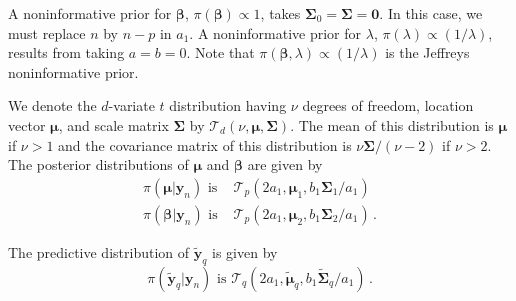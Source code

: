 \documentclass[11pt, oneside]{article}   	%
\begin{document}
A noninformative prior for $\mathbf{\beta}$, $\pi(\mathbf{\beta}) \propto 1$, takes $\mathbf{\Sigma}_0 = \mathbf{\Sigma} = \mathbf{0}$.  In this case, we must replace $n$ by $n-p$ in $a_1$.  A noninformative prior for $\lambda$, $\pi(\lambda) \propto (1/\lambda)$, results from taking $a = b = 0$.  Note that $\pi(\mathbf{\beta}, \lambda) \propto (1/\lambda)$ is the Jeffreys noninformative prior.

We denote the $d$-variate $t$ distribution having $\nu$ degrees of freedom, location vector $\mathbf{\mu}$, and scale matrix $\mathbf{\Sigma}$ by $\mathcal{T}_d (\nu, \mathbf{\mu}, \mathbf{\Sigma})$.  The mean of this distribution is $\mathbf{\mu}$ if $\nu > 1$ and the covariance matrix of this distribution is $\nu \mathbf{\Sigma} / (\nu -2)$ if $\nu > 2$.  The posterior distributions of $\mathbf{\mu}$ and $\mathbf{\beta}$ are given by
\begin{align*}
\pi( \mathbf{\mu} | \mathbf{y}_n ) \mbox{ is } & \mathcal{T}_p \left( 2 a_1, \mathbf{\mu}_1, b_1 \mathbf{\Sigma}_1 / a_1 \right) \\[1ex]
\pi( \mathbf{\beta} | \mathbf{y}_n ) \mbox{ is } & \mathcal{T}_p \left( 2 a_1, \mathbf{\mu}_2, b_1 \mathbf{\Sigma}_2 / a_1 \right) \,.
\end{align*}

The predictive distribution of $\tilde{\mathbf{y}}_q$ is given by
\[
\pi( \tilde{\mathbf{y}}_q | \mathbf{y}_n ) \mbox{ is } \mathcal{T}_q \left( 2 a_1, \tilde{\mathbf{\mu}}_q, b_1 \tilde{\mathbf{\Sigma}}_q / a_1 \right) \,.
\] 
\end{document}
